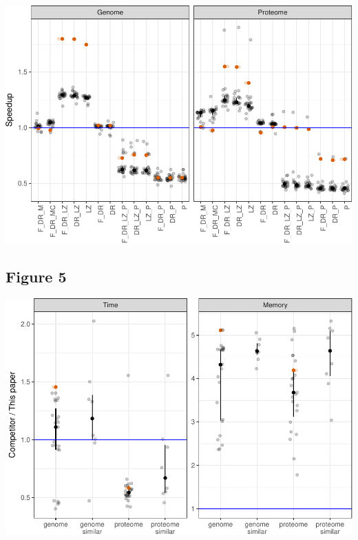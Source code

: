 \documentclass[]{article}
\begin{document}
\includegraphics{sea_2018_files/figure-latex/fig4-1.pdf}

\subsection{Figure 5}\label{figure-5}

\includegraphics{sea_2018_files/figure-latex/fig5-1.pdf}
\end{document}
